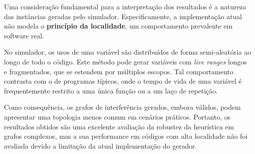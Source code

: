 Uma consideração fundamental para a interpretação dos resultados é a natureza das instâncias geradas pelo simulador. Especificamente, a implementação atual não modela o \textbf{princípio da localidade}, um comportamento prevalente em software real.

No simulador, os usos de uma variável são distribuídos de forma semi-aleatória ao longo de todo o código. Este método pode gerar variáveis com \textit{live ranges} longos e fragmentados, que se estendem por múltiplos escopos. Tal comportamento contrasta com o de programas típicos, onde o tempo de vida de uma variável é frequentemente restrito a uma única função ou a um laço de repetição.

Como consequência, os grafos de interferência gerados, embora válidos, podem apresentar uma topologia menos comum em cenários práticos. Portanto, os resultados obtidos são uma excelente avaliação da robustez da heurística em grafos complexos, mas a sua performance em códigos com alta localidade não foi avaliada devido a limitação da atual implementação do gerador.
